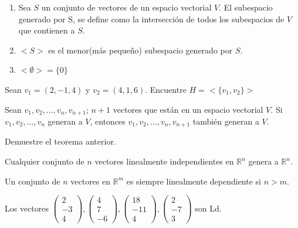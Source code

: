 \begin{rmk}
\begin{enumerate}
\item Sea $S$ un conjunto de vectores de un espacio vectorial $V$. El subespacio generado por S,
se define como la intersección de todos los subespacios de $V$ que contienen a $S$.
\item $<S>$ es el menor(m\'as pequeño) subespacio generado por $S$.
\item $<\emptyset>=\{0\}$
\end{enumerate}
\end{rmk}



\begin{ejem}
Sean $v_1 = (2,-1,4)$ y $v_2 = (4,1,6)$. Encuentre $H=<\{ v_1,v_2 \}>$
\end{ejem}

\begin{thm}
Sean $v_1, v_2, \dots, v_n, v_{n+1}$; $n+1$ vectores que están en un espacio vectorial $V$. Si $v_1, v_2, \dots , v_n$ generan a $V$, entonces $v_1, v_2, \dots, v_n, v_{n+1}$ también generan a $V$.
\end{thm}




\begin{ejer}
Demuestre el teorema anterior.
\end{ejer}


\begin{thm}
Cualquier conjunto de $n$ vectores linealmente independientes en $\mathbb{R}^n$ genera a $\mathbb{R}^n$.
\end{thm}









\begin{thm}
Un conjunto de $n$ vectores en $\mathbb{R}^m$ es siempre linealmente dependiente si $n > m$.
\end{thm}

\begin{ejem}
Los vectores  $\begin{pmatrix} 2 \\ -3 \\ 4 \end{pmatrix}, \begin{pmatrix} 4 \\ 7 \\ -6 \end{pmatrix}, \begin{pmatrix} 18 \\ -11 \\ 4 \end{pmatrix}, \begin{pmatrix} 2 \\ -7 \\ 3 \end{pmatrix}$ son Ld.
\end{ejem}

